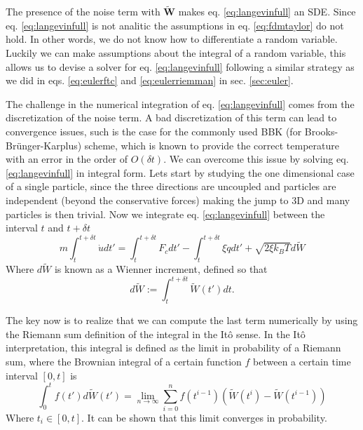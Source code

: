 \documentclass[ twoside,openright,titlepage,numbers=noenddot,%
headinclude,footinclude,cleardoublepage=empty,abstract=on,
BCOR=5mm,paper=a4,fontsize=11pt, dvipsnames
]{scrreprt}
\renewcommand{\vec}[1]{\bm{#1}}
\newcommand{\dt}{\delta t}
\newcommand{\kT}{k_B T}
\newcommand{\noise}{\widetilde{W}}
\newcommand{\ppos}{q}
\newcommand{\pvel}{u}
\begin{document}
The presence of the noise term with $\vec{\widetilde{W}}$ makes eq. \eqref{eq:langevinfull} an \gls{SDE}. Since eq. \eqref{eq:langevinfull} is not analitic the assumptions in eq. \eqref{eq:fdmtaylor} do not hold. In other words, we do not know how to differentiate a random variable. Luckily we can make assumptions about the integral of a random variable, this allows us to devise a solver for eq. \eqref{eq:langevinfull} following a similar strategy as we did in eqs. \eqref{eq:eulerftc} and \eqref{eq:eulerriemman} in sec. \ref{sec:euler}.

The challenge in the numerical integration of eq. \eqref{eq:langevinfull} comes from the discretization of the noise term.
A bad discretization of this term can lead to convergence issues, such is the case for the commonly used BBK (for Brooks-Brünger-Karplus) scheme\cite{Brunger1984}, which is known to provide the correct temperature with an error in the order of $O(\dt)$\cite{Wang2003}.
We can overcome this issue by solving eq. \eqref{eq:langevinfull} in integral form. Lets start by studying the one dimensional case of a single particle, since the three directions are uncoupled and particles are independent (beyond the conservative forces) making the jump to 3D and many particles is then trivial. Now we integrate eq. \eqref{eq:langevinfull} between the interval $t$ and $t+\dt$
\begin{equation}
  \label{eq:langevinriemann}
  m\int_t^{t+\dt}\dot{\pvel} dt' = \int_t^{t+\dt}F_c dt' - \int_t^{t+\dt}\xi\dot{\ppos}dt' + \sqrt{2\xi\kT}d\noise
\end{equation}
Where $d\noise$ is known as a Wienner increment, defined so that
\begin{equation}
  \label{eq:langevinwiennerinc}
  d\noise := \int_t^{t+\dt}\noise(t') dt.
\end{equation}

The key now is to realize that we can compute the last term numerically by using the Riemann sum definition of the integral in the Itô sense.
In the Itô interpretation, this integral is defined as the limit in probability of a Riemann sum, where the Brownian integral of a certain function $f$ between a certain time interval $[0, t]$ is
\begin{equation}
  \label{eq:itonoise}
  \int_0^tf(t')d\noise(t') = \lim_{n\rightarrow\infty}\sum_{i=0}^nf(t^{i-1}) (\noise(t^i) - \noise({t^{i-1}}))
\end{equation}
Where $t_i\in [0, t]$.
It can be shown that this limit converges in probability\cite{Cohen2015}.
\end{document}

